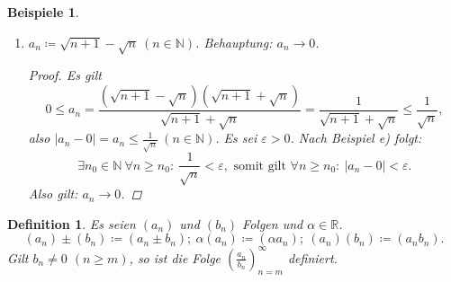 \documentclass[12pt]{extreport} %
\newcommand{\N}{\mathbb{N}}
\newcommand{\R}{\mathbb{R}}
\theoremstyle{named}
\theoremstyle{itshape}
\newtheorem*{definition}{Definition}
\theoremstyle{normal}
\newtheorem*{beispiele}{Beispiele}
\begin{document}
\begin{beispiele}
\begin{enumerate}
\begin{proof}
			\end{proof}
		\item $a_{n} \coloneqq \sqrt{n + 1} - \sqrt{n} ~(n \in \N)$. Behauptung: $a_{n} \rightarrow 0$.
			\begin{proof}
                                Es gilt			
				$$
					0 \le a_{n} = \frac{(\sqrt{n + 1} - \sqrt{n})(\sqrt{n + 1} + \sqrt{n})}{\sqrt{n + 1} + \sqrt{n}} 
					= \frac{1}{\sqrt{n + 1} + \sqrt{n}} \leq \frac{1}{\sqrt{n}},
				$$
				also $|a_{n} - 0| =a_n \leq \frac{1}{\sqrt{n}} ~ (n \in \N)$. Es sei $\varepsilon > 0$. Nach Beispiel e) folgt:
				$$
					\exists n_{0} \in \N ~\forall n \geq n_{0}: ~ \frac{1}{\sqrt{n}} < \varepsilon, \text{ somit gilt } 
					\forall n \geq n_{0}: ~ |a_{n} - 0| < \varepsilon. 
				$$
				Also gilt: $a_{n} \rightarrow 0$.
			\end{proof}
	\end{enumerate}
\end{beispiele}


\begin{definition}
	Es seien $(a_{n})$ und $(b_{n})$ Folgen und $\alpha \in \R$.
	$$
		(a_{n}) \pm (b_{n}) \coloneqq (a_{n} \pm b_{n}); ~
		\alpha (a_{n}) \coloneqq (\alpha a_{n}); ~
		(a_{n}) (b_{n}) \coloneqq (a_{n} b_{n}). 		
	$$	
	Gilt $b_{n} \neq 0$ $(n \ge m)$, so ist die Folge $\left( \frac{a_{n}}{b_{n}} \right)_{n = m}^{\infty}$ definiert.
\end{definition}
\end{document}
